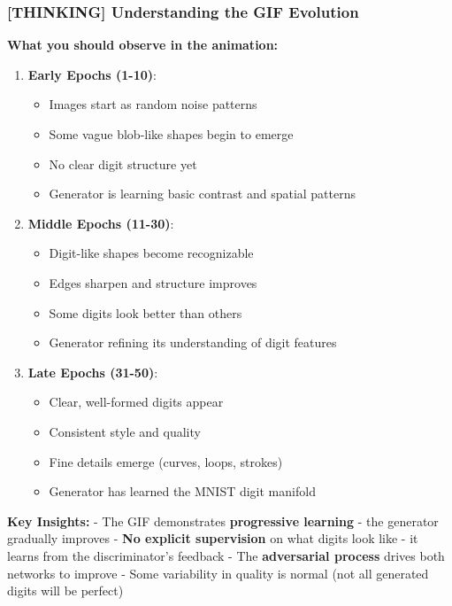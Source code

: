 \documentclass[11pt]{article}
\providecommand{\tightlist}{%
      \setlength{\itemsep}{0pt}\setlength{\parskip}{0pt}}
\begin{document}
    
    \subsubsection{{[}THINKING{]} Understanding the GIF
Evolution}\label{thinking-understanding-the-gif-evolution}

\textbf{What you should observe in the animation:}

\begin{enumerate}
\def\labelenumi{\arabic{enumi}.}
\tightlist
\item
  \textbf{Early Epochs (1-10)}:

  \begin{itemize}
  \tightlist
  \item
    Images start as random noise patterns
  \item
    Some vague blob-like shapes begin to emerge
  \item
    No clear digit structure yet
  \item
    Generator is learning basic contrast and spatial patterns
  \end{itemize}
\item
  \textbf{Middle Epochs (11-30)}:

  \begin{itemize}
  \tightlist
  \item
    Digit-like shapes become recognizable
  \item
    Edges sharpen and structure improves
  \item
    Some digits look better than others
  \item
    Generator refining its understanding of digit features
  \end{itemize}
\item
  \textbf{Late Epochs (31-50)}:

  \begin{itemize}
  \tightlist
  \item
    Clear, well-formed digits appear
  \item
    Consistent style and quality
  \item
    Fine details emerge (curves, loops, strokes)
  \item
    Generator has learned the MNIST digit manifold
  \end{itemize}
\end{enumerate}

\textbf{Key Insights:} - The GIF demonstrates \textbf{progressive
learning} - the generator gradually improves - \textbf{No explicit
supervision} on what digits look like - it learns from the
discriminator's feedback - The \textbf{adversarial process} drives both
networks to improve - Some variability in quality is normal (not all
generated digits will be perfect)
\end{document}
